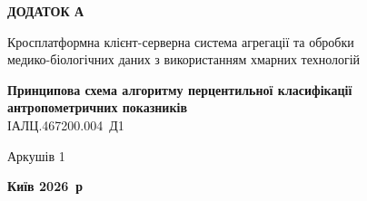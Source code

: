 \documentclass[%
  ukrainian, utf8, columnvii, simple,
  hpadding=10mm, vpadding=10mm, reduceheight=2mm,
  floatsection,
]{eskdtext}
\begin{document}
\thispagestyle{empty}
\begin{center}
\vspace*{3cm}
{\large\textbf{ДОДАТОК А}}

\vspace{1.5cm}
{\normalsize Кросплатформна клієнт-серверна система агрегації та обробки\\
медико-біологічних даних з використанням хмарних технологій}

\vfill
{\large\textbf{Принципова схема алгоритму перцентильної класифікації антропометричних показників}}\\[0.6em]
{\normalsize ІАЛЦ.467200.004~Д1}

\vspace{2.5cm}
{\normalsize Аркушів 1}

\vfill
{\large\textbf{Київ 2026~р}}
\end{center}
\clearpage
{}
\end{document}
